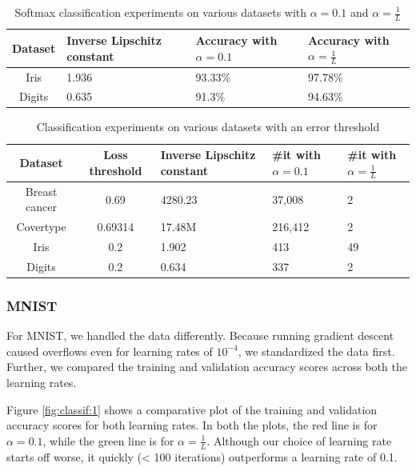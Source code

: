 \documentclass{article}
\begin{document}
\begin{table}
    \caption{Softmax classification experiments on various datasets with $\alpha=0.1$ and $\alpha=\frac{1}{L}$}
    \centering
    \begin{tabularx}{\textwidth}{cYYY}
        \toprule
        Dataset & Inverse Lipschitz constant & Accuracy with $\alpha=0.1$ & Accuracy with $\alpha=\frac{1}{L}$ \\
        \midrule
        Iris & 1.936 & 93.33\% & 97.78\% \\
        Digits & 0.635 & 91.3\% & 94.63\% \\
        \bottomrule
    \end{tabularx}
    \label{tab:classif:2}
\end{table}

\begin{table}
    \caption{Classification experiments on various datasets with an error threshold}
    \centering
    \begin{tabularx}{\textwidth}{ccYYY}
        \toprule
        Dataset & Loss threshold & Inverse Lipschitz constant & \#it with $\alpha=0.1$ & \#it with $\alpha=\frac{1}{L}$ \\
        \midrule
        Breast cancer & 0.69 & 4280.23 & 37,008 & 2 \\
        Covertype & 0.69314 & 17.48M & 216,412 & 2 \\
        Iris & 0.2 & 1.902 & 413 & 49 \\
        Digits & 0.2 & 0.634 & 337 & 2 \\
        \bottomrule
    \end{tabularx}
    \label{tab:classif:3}
\end{table}

\subsubsection{MNIST}
For MNIST, we handled the data differently. Because running gradient descent caused overflows even for learning rates of $10^{-4}$, we standardized the data first. Further, we compared the training and validation accuracy scores across both the learning rates.

Figure \ref{fig:classif:1} shows a comparative plot of the training and validation accuracy scores for both learning rates. In both the plots, the red line is for $\alpha = 0.1$, while the green line is for $\alpha = \frac{1}{L}$. Although our choice of learning rate starts off worse, it quickly (< 100 iterations) outperforms a learning rate of 0.1. 
\end{document}
